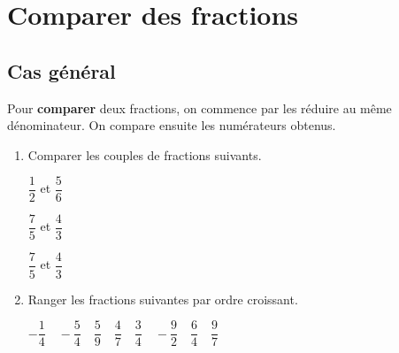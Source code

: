 \documentclass[a4paper]{book}
\begin{document}
\newpage


\section{Comparer des fractions}
\subsection{Cas général}

    \begin{propriete}
        Pour \textbf{comparer} deux fractions, on commence par les réduire au même dénominateur. On compare ensuite les numérateurs obtenus.
    \end{propriete}

    \begin{exemple}
        \begin{enumerate}
            \item Comparer les couples de fractions suivants.

            \begin{minipage}{0.3\linewidth}
                $\dfrac{1}{2}$ et $\dfrac{5}{6}$
    
                \vspace{2cm}
            \end{minipage}
            \hfill\vline\hfill
            \begin{minipage}{0.3\linewidth}
                $\dfrac{7}{5}$ et $\dfrac{4}{3}$
    
                \vspace{2cm}
            \end{minipage}
            \hfill\vline\hfill
            \begin{minipage}{0.3\linewidth}
                $\dfrac{7}{5}$ et $\dfrac{4}{3}$
    
                \vspace{1.5cm}
            \end{minipage}

            \item Ranger les fractions suivantes par ordre croissant.

            $-\dfrac{1}{4} \quad -\dfrac{5}{4} \quad \dfrac{5}{9} \quad \dfrac{4}{7} \quad \dfrac{3}{4} \quad -\dfrac{9}{2} \quad \dfrac{6}{4} \quad \dfrac{9}{7}$

            \vspace{3cm}
            
        \end{enumerate}
    \end{exemple}
\end{document}
